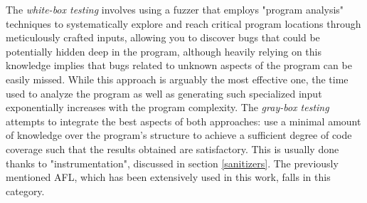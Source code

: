 \newline \newline
The \textit{white-box testing} involves using a fuzzer that employs "program analysis" techniques to systematically explore and reach critical program locations through meticulously crafted inputs, allowing you to discover bugs that could be potentially hidden deep in the program, although heavily relying on this knowledge implies that bugs related to unknown aspects of the program can be easily missed. While this approach is arguably the most effective one, the time used to analyze the program as well as generating such specialized input exponentially increases with the program complexity.
\newline \newline
The \textit{gray-box testing} attempts to integrate the best aspects of both approaches: use a minimal amount of knowledge over the program's structure to achieve a sufficient degree of code coverage such that the results obtained are satisfactory. This is usually done thanks to "instrumentation", discussed in section \ref{sanitizers}.
The previously mentioned AFL, which has been extensively used in this work, falls in this category.

